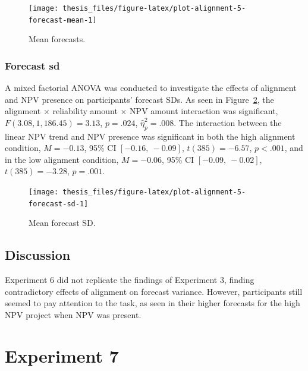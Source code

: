 \documentclass[a4paper, nobind, dvipsnames]{templates/ociamthesis}
\theoremstyle{definition}
\theoremstyle{definition}
\theoremstyle{definition}
\theoremstyle{definition}
\theoremstyle{remark}
\begin{document}
\begin{figure}
\texttt{[image: thesis\_files/figure-latex/plot-alignment-5-forecast-mean-1]} \caption{Mean forecasts.}\label{fig:plot-alignment-5-forecast-mean}
\end{figure}

\hypertarget{forecast-sd-alignment-5}{%
\subsubsection{Forecast sd}\label{forecast-sd-alignment-5}}

A mixed factorial ANOVA was conducted to investigate the effects of alignment
and NPV presence on participants' forecast SDs. As seen in
Figure~\ref{fig:plot-alignment-5-forecast-sd}, the alignment \(\times\)
reliability amount \(\times\) NPV amount interaction was significant,
\(F(3.08, 1,186.45) = 3.13\), \(p = .024\), \(\hat{\eta}^2_p = .008\).
The interaction between the linear NPV trend and NPV presence was significant in
both the high alignment condition,
\(M = -0.13\), 95\% CI \([-0.16,~-0.09]\), \(t(385) = -6.57\), \(p < .001\), and in the
low alignment condition,
\(M = -0.06\), 95\% CI \([-0.09,~-0.02]\), \(t(385) = -3.28\), \(p = .001\).



\begin{figure}
\texttt{[image: thesis\_files/figure-latex/plot-alignment-5-forecast-sd-1]} \caption{Mean forecast SD.}\label{fig:plot-alignment-5-forecast-sd}
\end{figure}

\hypertarget{discussion-13}{%
\subsection{Discussion}\label{discussion-13}}

Experiment 6 did not replicate the findings of Experiment 3, finding
contradictory effects of alignment on forecast variance. However, participants
still seemed to pay attention to the task, as seen in their higher forecasts for
the high NPV project when NPV was present.

\hypertarget{alignment-6}{%
\section{Experiment 7}\label{alignment-6}}
\end{document}
